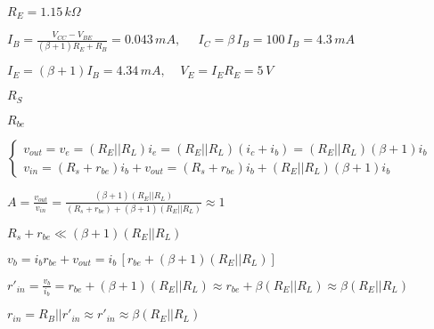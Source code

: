 \documentclass{article}
\def\lthtmlcheckvsize{\ifdim\ht\sizebox<\vsize 
  \ifdim\wd\sizebox<\hsize\expandafter\hfill\fi \expandafter\vfill
  \else\expandafter\vss\fi}%
\begin{document}
{\newpage\clearpage
{}%
$ R_E=1.15\,k\Omega$%
\lthtmlindisplaymathZ
\lthtmlcheckvsize\clearpage}

{\newpage\clearpage
{}%
$\displaystyle I_B=\frac{V_{CC}-V_{BE}}{(\beta+1)R_E+R_B}=0.043\,mA,
\;\;\;\;\;I_C=\beta\,I_B=100\,I_B=4.3\,mA$%
\lthtmlindisplaymathZ
\lthtmlcheckvsize\clearpage}

{\newpage\clearpage
{}%
$\displaystyle I_E=(\beta+1)I_B=4.34\,mA,\;\;\;\;V_E=I_ER_E=5\,V$%
\lthtmlindisplaymathZ
\lthtmlcheckvsize\clearpage}

{\newpage\clearpage
{}%
$ R_S$%
\lthtmlindisplaymathZ
\lthtmlcheckvsize\clearpage}

{\newpage\clearpage
{}%
$ R_{be}$%
\lthtmlindisplaymathZ
\lthtmlcheckvsize\clearpage}

{\newpage\clearpage
{}%
$\displaystyle \left\{ \begin{array}{l}
v_{out}=v_e=(R_E||R_L)i_e =(R_E||R_L)(i_c+i_b)=(R_E||R_L)(\beta+1) i_b 	\\
v_{in}=(R_s+r_{be})i_b +v_{out}=(R_s+r_{be})i_b+(R_E||R_L)(\beta+1) i_b
\end{array} \right.$%
\lthtmlindisplaymathZ
\lthtmlcheckvsize\clearpage}

{\newpage\clearpage
{}%
$\displaystyle A=\frac{v_{out}}{v_{in}}
=\frac{(\beta+1) (R_E||R_L)}{(R_s+r_{be})+(\beta+1) (R_E||R_L)} \approx 1$%
\lthtmlindisplaymathZ
\lthtmlcheckvsize\clearpage}

{\newpage\clearpage
{}%
$ R_s+r_{be} \ll (\beta+1) (R_E||R_L)$%
\lthtmlindisplaymathZ
\lthtmlcheckvsize\clearpage}

{\newpage\clearpage
{}%
$\displaystyle v_b=i_b r_{be}+v_{out}=i_b\, [ r_{be}+(\beta+1)(R_E||R_L) ]$%
\lthtmlindisplaymathZ
\lthtmlcheckvsize\clearpage}

{\newpage\clearpage
{}%
$\displaystyle r'_{in}=\frac{v_b}{i_b}=r_{be}+(\beta+1) (R_E||R_L)
\approx r_{be}+\beta (R_E||R_L)\approx \beta (R_E||R_L)$%
\lthtmlindisplaymathZ
\lthtmlcheckvsize\clearpage}

{\newpage\clearpage
{}%
$\displaystyle r_{in}=R_B||r'_{in} \approx r'_{in}\approx \beta (R_E||R_L)$%
\lthtmlindisplaymathZ
\lthtmlcheckvsize\clearpage}
\end{document}
